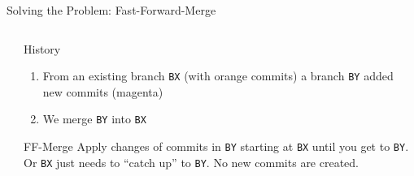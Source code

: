 \documentclass[xetex, handout]{beamer}
\begin{document}
\begin{frame}[fragile]{Solving the Problem: Fast-Forward-Merge}
\begin{columns}
\begin{column}{.5\linewidth}
    \end{column}
    \begin{column}{.5\linewidth}
      \begin{exampleblock}{History}
        \begin{enumerate}
          \item From an existing branch \texttt{BX} (with orange commits) a
            branch \texttt{BY} added new commits (magenta)
          \item We merge \texttt{BY} into \texttt{BX}
        \end{enumerate}
      \end{exampleblock}
      \begin{alertblock}{FF-Merge}
        Apply changes of commits in \texttt{BY} starting at \texttt{BX} until
        you get to \texttt{BY}. Or \texttt{BX} just needs to ``catch up'' to
        \texttt{BY}. No new commits are created.
      \end{alertblock}
    \end{column}
  \end{columns}
\end{frame}
\end{document}
